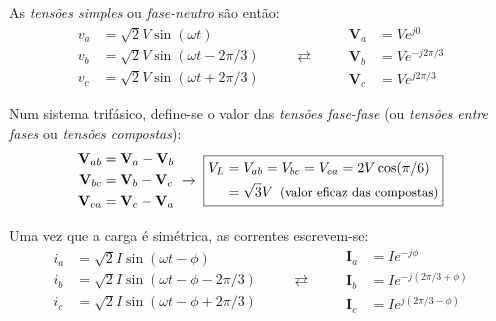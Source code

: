 \begin{minipage}[c]{0.525\textwidth} \small
    \noindent As \textit{tensões simples} ou \textit{fase-neutro} são então: 
    $$ 
    \begin{aligned} 
        v_a &= \sqrt{2} V \sin(\omega t) \\ 
        v_b &= \sqrt{2} V \sin(\omega t - 2\pi/3) \\ 
        v_c &= \sqrt{2} V \sin(\omega t + 2\pi/3) 
    \end{aligned} 
    \qquad\rightleftarrows\qquad 
    \begin{aligned} 
        \mathbf{V}_{a} &= V e^{j0} \\ 
        \mathbf{V}_{b} &= V e^{-j2\pi/3} \\ 
        \mathbf{V}_{c} &= V e^{j2\pi/3} 
    \end{aligned} 
    $$ 
    
    Num sistema trifásico, define-se o valor das \textit{tensões fase-fase} (ou \textit{tensões entre fases} ou \textit{tensões compostas}): 
    $$ 
    \begin{aligned} 
        \mathbf{V}_{ab} &= \mathbf{V}_a - \mathbf{V}_b \\ 
        \mathbf{V}_{bc} &= \mathbf{V}_b - \mathbf{V}_c \\ 
        \mathbf{V}_{ca} &= \mathbf{V}_c - \mathbf{V}_a 
    \end{aligned} 
    \;\rightarrow\; 
    \boxed{\begin{aligned} 
        V_L &= V_{ab} = V_{bc} = V_{ca} = 2V \cos(\pi/6) \\ 
            &= \sqrt{3} V \mkern9mu\text{\small (valor eficaz das compostas)}
    \end{aligned}} 
    $$ 
    
    \noindent Uma vez que a carga é simétrica, as correntes escrevem-se: 
    $$ \begin{aligned} 
        i_a &= \sqrt{2} I \sin(\omega t - \phi) \\ 
        i_b &= \sqrt{2} I \sin(\omega t - \phi - 2\pi/3) \\ 
        i_c &= \sqrt{2} I \sin(\omega t - \phi + 2\pi/3) 
    \end{aligned} 
    \qquad\rightleftarrows\qquad 
    \begin{aligned} 
        \mathbf{I}_{a} &= I e^{-j\phi} \\ 
        \mathbf{I}_{b} &= I e^{-j(2\pi/3 + \phi)} \\ 
        \mathbf{I}_{c} &= I e^{j(2\pi/3 - \phi)} 
    \end{aligned} 
    $$
\end{minipage}

